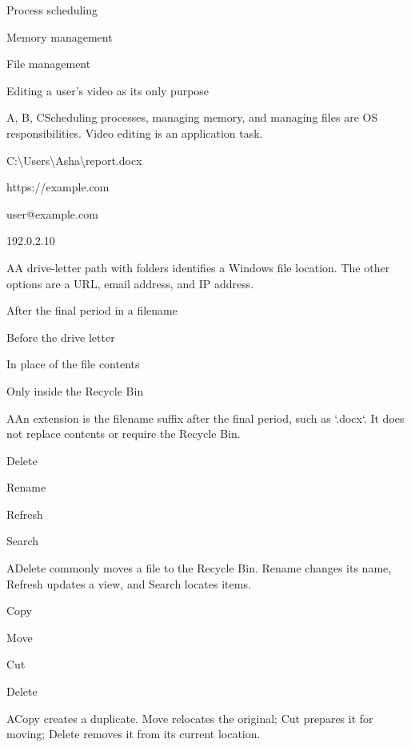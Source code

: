 \begin{enumerate}[label=\textbf{Q\arabic*.}, leftmargin=*]
  {\item Process scheduling
   \item Memory management
   \item File management
   \item Editing a user's video as its only purpose}
  {A, B, C}{Scheduling processes, managing memory, and managing files are OS responsibilities. Video editing is an application task.}
\fi
\ifnum{}
  {\item C:\textbackslash Users\textbackslash Asha\textbackslash report.docx
   \item https://example.com
   \item user@example.com
   \item 192.0.2.10}
  {A}{A drive-letter path with folders identifies a Windows file location. The other options are a URL, email address, and IP address.}
  {\item After the final period in a filename
   \item Before the drive letter
   \item In place of the file contents
   \item Only inside the Recycle Bin}
  {A}{An extension is the filename suffix after the final period, such as `.docx`. It does not replace contents or require the Recycle Bin.}
  {\item Delete
   \item Rename
   \item Refresh
   \item Search}
  {A}{Delete commonly moves a file to the Recycle Bin. Rename changes its name, Refresh updates a view, and Search locates items.}
  {\item Copy
   \item Move
   \item Cut
   \item Delete}
  {A}{Copy creates a duplicate. Move relocates the original; Cut prepares it for moving; Delete removes it from its current location.}

\end{enumerate}
